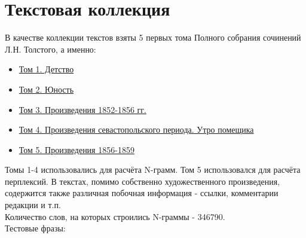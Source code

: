 \documentclass[a4paper,12pt]{article}
\begin{document}
\section{Текстовая коллекция}
В качестве коллекции текстов взяты 5 первых тома Полного собрания сочинений Л.Н. Толстого, а именно:
\begin{itemize}
\item \href{https://royallib.com/book/tolstoy_lev/polnoe_sobranie_sochineniy_tom_1_detstvo.html}{Том 1. Детство}
\item \href{https://royallib.com/book/tolstoy_lev/polnoe_sobranie_sochineniy_tom_2_yunost.html}{Том 2. Юность}
\item \href{https://royallib.com/book/tolstoy_lev/polnoe_sobranie_sochineniy_tom_3_proizvedeniya_18521856_gg.html}{Том 3. Произведения 1852-1856 гг.}
\item \href{https://royallib.com/book/tolstoy_lev/polnoe_sobranie_sochineniy_tom_4_proizvedeniya_sevastopolskogo_perioda_utro_pomeshchika.html}{Том 4. Произведения севастопольского периода. Утро помещика}
\item \href{https://royallib.com/book/tolstoy_lev/polnoe_sobranie_sochineniy_tom_5_proizvedeniya_18561859_gg.html}{Том 5. Произведения 1856-1859}
\end{itemize}
Томы 1-4 использовались для расчёта N-грамм. Том 5 использовался для расчёта перплексий.
В текстах, помимо собственно художественного произведения, содержится также различная побочная информация - ссылки, комментарии редакции и т.п.\\
Количество слов, на которых строились N-граммы - 346790.\\
Тестовые фразы:
\end{document}
